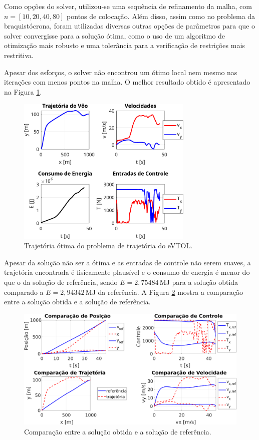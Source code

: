 Como opções do solver, utilizou-se uma sequência de refinamento da malha, com $n=[10, 20, 40, 80]$ pontos de colocação. Além disso, assim como no problema da braquistócrona, foram utilizadas diversas outras opções de parâmetros para que o solver convergisse para a solução ótima, como o uso de um algoritmo de otimização mais robusto e uma tolerância para a verificação de restrições mais restritiva.

Apesar dos esforços, o solver não encontrou um ótimo local nem mesmo nas iterações com menos pontos na malha. O melhor resultado obtido é apresentado na Figura \ref{fig:resultados-evtol}.

\begin{figure}[H]
    \centering
    \includegraphics[width=0.75\textwidth]{Cap4/figuras/evtol.pdf}
    \caption{Trajetória ótima do problema de trajetória do eVTOL.}
    \label{fig:resultados-evtol}
\end{figure}

Apesar da solução não ser a ótima e as entradas de controle não serem suaves, a trajetória encontrada é fisicamente plausível e o consumo de energia é menor do que o da solução de referência, sendo $E=2,75484 \, \si{\mega\joule}$ para a solução obtida comparado a $E=2,94342 \, \si{\mega\joule}$ da referência. A Figura \ref{fig:resultados-evtol-comparacao} mostra a comparação entre a solução obtida e a solução de referência.

\begin{figure}[H]
    \centering
    \includegraphics[width=\textwidth]{Cap4/figuras/evtol-comparacao.pdf}
    \caption{Comparação entre a solução obtida e a solução de referência.}
    \label{fig:resultados-evtol-comparacao}
\end{figure}

